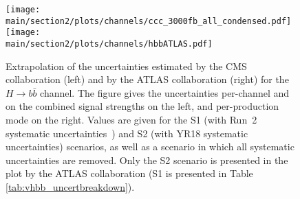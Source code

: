 \begin{figure}[h!]
\begin{center}
\texttt{[image: \\main/section2/plots/channels/ccc\_3000fb\_all\_condensed.pdf]}
\texttt{[image: \\main/section2/plots/channels/hbbATLAS.pdf]}
\end{center}
\caption{Extrapolation of the uncertainties estimated by the CMS collaboration (left) and by the ATLAS collaboration (right) for the $H \to b\bar{b}$ channel. The figure gives the uncertainties per-channel and on the combined signal strengths on the left, and per-production mode on the right. Values are given for the S1 (with Run~2 systematic uncertainties~\cite{HIG16044}) and S2 (with YR18 systematic uncertainties) scenarios, as well as a scenario in which all systematic uncertainties are removed. Only the S2 scenario is presented in the plot by the ATLAS collaboration (S1 is presented in Table \ref{tab:vhbb_uncertbreakdown}).}
\label{fig:vhbb_proj_bars}
\end{figure}
